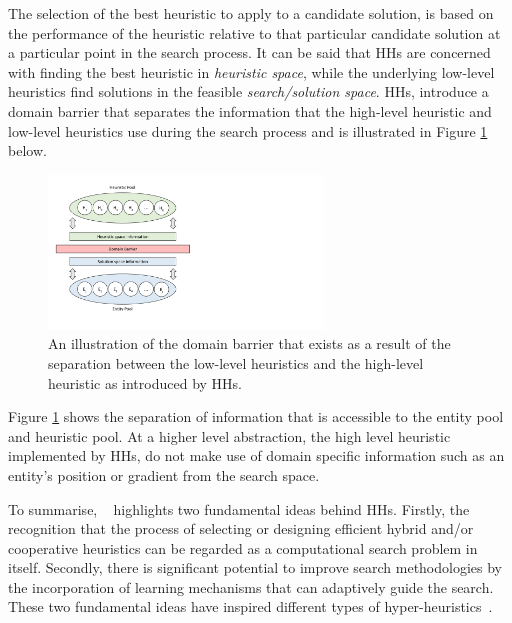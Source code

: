 The selection of the best heuristic to apply to a candidate solution, is based on the performance of the heuristic relative to that particular candidate solution at a particular point in the search process. It can be said that \acp{HH} are concerned with finding the best heuristic in \textit{heuristic space}, while the underlying low-level heuristics find solutions in the feasible \textit{search/solution space}. \acp{HH}, introduce a domain barrier that separates the information that the high-level heuristic and low-level heuristics use during the search process and is illustrated in Figure \ref{fig:heuristics:hh:hh_algorithm} below.

\begin{figure}[htbp]
      \begin{centering}
            \centering
            \includegraphics[width=0.65\textwidth]{images/hh_domain_barrier.pdf}
            \caption{An illustration of the domain barrier that exists as a result of the separation between the low-level heuristics and the high-level heuristic as introduced by \acp{HH}.}
            \label{fig:heuristics:hh:hh_algorithm}
      \end{centering}
\end{figure}

Figure \ref{fig:heuristics:hh:hh_algorithm} shows the separation of information that is accessible to the entity pool and heuristic pool. At a higher level abstraction, the high level heuristic implemented by \acp{HH}, do not make use of domain specific information such as an entity's position or gradient from the search space.

To summarise, \citeauthor{ref:grobler:2015}~\cite{ref:grobler:2015} highlights two fundamental ideas behind \acp{HH}. Firstly, the recognition that the process of selecting or designing efficient hybrid and/or cooperative heuristics can be regarded as a computational search problem in itself. Secondly, there is significant potential to improve search methodologies by the incorporation of learning mechanisms that can adaptively guide the search. These two fundamental ideas have inspired different types of hyper-heuristics~\cite{ref:burke:2010}.

